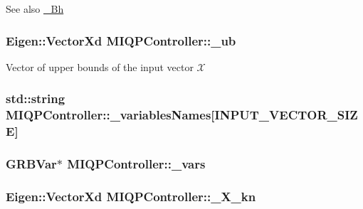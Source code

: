 \begin{DoxySeeAlso}{\-See also}
\hyperlink{classMIQPController_a9a989875871a898f0ad19b441a2c67ba}{\-\_\-\-Bh} 
\end{DoxySeeAlso}
\hypertarget{classMIQPController_aa8407451ad8b20c814b12fef631f43f6}{
\subsubsection[{\-\_\-ub}]{\setlength{\rightskip}{0pt plus 5cm}\-Eigen\-::\-Vector\-Xd {\bf \-M\-I\-Q\-P\-Controller\-::\-\_\-ub}}}\label{classMIQPController_aa8407451ad8b20c814b12fef631f43f6}
\-Vector of upper bounds of the input vector $\mathcal{X}$ \hypertarget{classMIQPController_a2c3ddd93fd843a3a4650314b47436be7}{
\subsubsection[{\-\_\-variables\-Names}]{\setlength{\rightskip}{0pt plus 5cm}std\-::string {\bf \-M\-I\-Q\-P\-Controller\-::\-\_\-variables\-Names}\mbox{[}{\bf \-I\-N\-P\-U\-T\-\_\-\-V\-E\-C\-T\-O\-R\-\_\-\-S\-I\-Z\-E}\mbox{]}}}\label{classMIQPController_a2c3ddd93fd843a3a4650314b47436be7}
\hypertarget{classMIQPController_a1143bf95d61a348b08010c909b190029}{
\subsubsection[{\-\_\-vars}]{\setlength{\rightskip}{0pt plus 5cm}\-G\-R\-B\-Var$\ast$ {\bf \-M\-I\-Q\-P\-Controller\-::\-\_\-vars}}}\label{classMIQPController_a1143bf95d61a348b08010c909b190029}
\hypertarget{classMIQPController_a1fdfcba2c7b6422ac8d3b0b6095d7546}{
\subsubsection[{\-\_\-\-X\-\_\-kn}]{\setlength{\rightskip}{0pt plus 5cm}\-Eigen\-::\-Vector\-Xd {\bf \-M\-I\-Q\-P\-Controller\-::\-\_\-\-X\-\_\-kn}}}\label{classMIQPController_a1fdfcba2c7b6422ac8d3b0b6095d7546}
